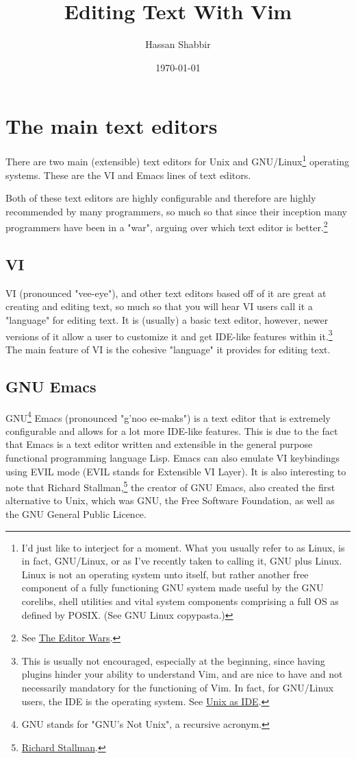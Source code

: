 \documentclass[11pt]{article}
\author{Hassan Shabbir}
\date{\today}
\title{Editing Text With Vim}
\begin{document}
\maketitle
\tableofcontents

\newpage

\section{The main text editors}
\label{sec:org8842b2f}
There are two main (extensible) text editors for Unix and GNU/Linux\footnote{I'd just like to interject for a moment. What you usually refer
to as Linux, is in fact, GNU/Linux, or as I've recently taken to calling
it, GNU plus Linux. Linux is not an operating system unto itself, but 
rather another free component of a fully functioning GNU system made 
useful by the GNU corelibs, shell utilities and vital system components
comprising a full OS as defined by POSIX. (See GNU Linux copypasta.)}
operating systems. These are the VI and Emacs lines of text editors.

Both of these text editors are highly configurable and therefore are highly
recommended by many programmers, so much so that since their inception many
programmers have been in a "war", arguing over which text editor is
better.\footnote{See \href{https://en.wikipedia.org/wiki/Editor\_war}{The Editor Wars}.}
\subsection{VI}
\label{sec:org9994cc5}
VI (pronounced "vee-eye"), and other text editors based off of it are great at
creating and editing text, so much so that you will hear VI users call it a 
"language" for editing text. It is (usually) a basic text editor, however, newer
versions of it allow a user to customize it and get IDE-like features within
it.\footnote{This is usually not encouraged, especially at the beginning,
since having plugins hinder your ability to understand Vim, and are nice
to have and not necessarily mandatory for the functioning of Vim. In
fact, for GNU/Linux users, the IDE is the operating system. See
\href{https://sanctum.geek.nz/arabesque/series/unix-as-ide/}{Unix as IDE}.} The main feature of VI is the cohesive "language" it provides for
editing text.
\subsection{GNU Emacs}
\label{sec:org3ce9159}
GNU\footnote{GNU stands for "GNU's Not Unix", a recursive acronym.} Emacs (pronounced "g'noo ee-maks") is a text editor that is extremely
configurable and allows for a lot more IDE-like features. This is due to the
fact that Emacs is a text editor written and extensible in the general purpose
functional programming language Lisp. Emacs can also emulate VI keybindings
using EVIL mode (EVIL stands for Extensible VI Layer). It is also interesting to
note that Richard Stallman,\footnote{\href{https://en.wikipedia.org/wiki/Richard\_Stallman}{Richard Stallman}.} the creator of GNU Emacs, also created the
first alternative to Unix, which was GNU, the Free Software Foundation, as well
as the GNU General Public Licence.
\end{document}
